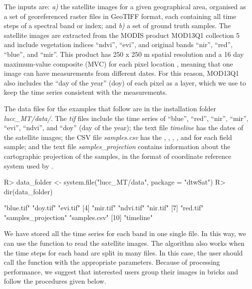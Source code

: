 \documentclass[article,shortnames]{jss}
\begin{document}
The inputs are: \emph{a)} the satellite images for a given geographical
area, organised as a set of georeferenced raster files in GeoTIFF
format, each containing all time steps of a spectral band or index; and
\emph{b)} a set of ground truth samples. The satellite images are
extracted from the MODIS product MOD13Q1 collection 5 \citep{Didan:2015}
and include vegetation indices ``ndvi'', ``evi'', and original bands
``nir'', ``red'', ``blue'', and ``mir''. This product has 250 x 250 m
spatial resolution and a 16 day maximum-value composite (MVC) for each
pixel location \citep{Didan:2015}, meaning that one image can have
measurements from different dates. For this reason, MOD13Q1 also
includes the ``day of the year'' (doy) of each pixel as a layer, which
we use to keep the time series consistent with the measurements.

The data files for the examples that follow are in the 
installation folder \emph{lucc\_MT/data/}. The \emph{tif} files include
the time series of ``blue'', ``red'', ``nir'', ``mir'', ``evi'',
``ndvi'', and ``doy'' (day of the year); the text file \emph{timeline}
has the dates of the satellite images; the CSV file \emph{samples.csv}
has the , , , , and
 for each field sample; and the text file
\emph{samples\_projection} contains information about the cartographic
projection of the samples, in the format of coordinate reference system
used by .

\begin{CodeChunk}

\begin{CodeInput}
R> data_folder <- system.file("lucc_MT/data", package = "dtwSat")
R> dir(data_folder)
\end{CodeInput}

\begin{CodeOutput}
 [1] "blue.tif"           "doy.tif"            "evi.tif"           
 [4] "mir.tif"            "ndvi.tif"           "nir.tif"           
 [7] "red.tif"            "samples_projection" "samples.csv"       
[10] "timeline"          
\end{CodeOutput}
\end{CodeChunk}

We have stored all the time series for each band in one single file. In
this way, we can use the function  to read the
satellite images. The algorithm also works when the time steps for each
band are split in many files. In this case, the user should call the
function  with the appropriate parameters. Because
of processing performance, we suggest that interested users group their
images in bricks and follow the procedures given below.
\end{document}
